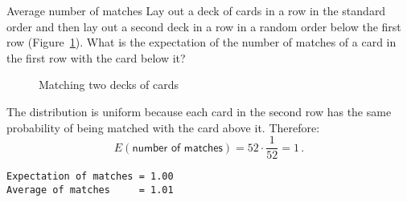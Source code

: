 
\begin{prob}{Average number of matches}
Lay out a deck of cards in a row in the standard order and then lay out a second deck in a row in a random order below the first row (Figure~\ref{f.cards}). What is the expectation of the number of matches of a card in the first row with the card below it?
\end{prob}

\begin{figure}[tb]
\begin{center}
\end{center}
\caption{Matching two decks of cards}\label{f.cards}
\end{figure}
\solution{}

The distribution is uniform because each card in the second row has the same probability of being matched with the card above it. Therefore:
\[
E(\textsf{number of matches}) = 52\cdot \frac{1}{52} = 1\,.
\]

\begin{verbatim}
Expectation of matches = 1.00
Average of matches     = 1.01
\end{verbatim}

